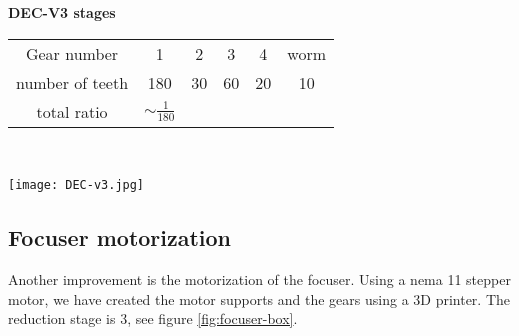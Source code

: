 \begin{minipage}
    {0.5\textwidth}
    \textbf{DEC-V3 stages}\\
    \centering
    \begin{tabular}{cccccc}
        \hline
        Gear number & 1 & 2 & 3 & 4 & worm\\
        number of teeth & 180 & 30 & 60 & 20 & 10\\
        \hline
        total ratio & \(\sim \frac{1}{180}\) &&&
    \end{tabular}
    \label{tab:DEC_gear_spec_v3}
\end{minipage}
\\
\begin{minipage}
    {0.5\textwidth}
    \centering
    \texttt{[image: DEC-v3.jpg]}
    \label{fig:DEC_mechanism_v3}
\end{minipage}

\subsection{Focuser motorization}
Another improvement is the motorization of the focuser.
Using a nema 11 stepper motor, we have created the motor supports and the gears using a 3D printer.
The reduction stage is 3, see figure \ref{fig:focuser-box}.